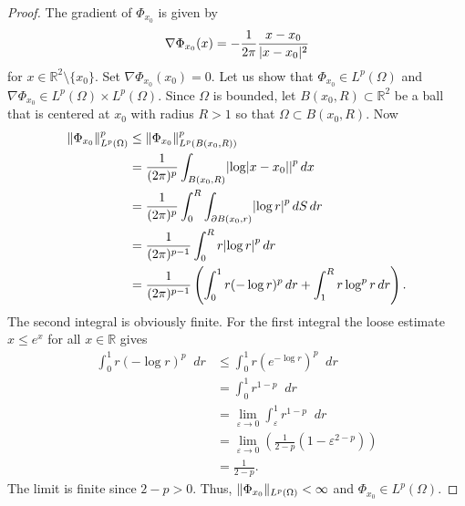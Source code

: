 \documentclass[english, 12pt, a4paper, sci, utf8, a-2b, online]{aaltothesis}
\theoremstyle{definition}
\theoremstyle{plain}
\DeclarePairedDelimiter\abs{\lvert}{\rvert}
\DeclarePairedDelimiter\norm{\lVert}{\rVert}
\newcommand*\diff{\mathop{}\!d}
\numberwithin{equation}{section}
\begin{document}
\begin{proof}
    The gradient of $\Phi_{x_0}$ is given by
    \begin{equation*}
        \nabla \Phi_{x_0}(x) = -\frac{1}{2\pi} \frac{x-x_0}{\abs{x-x_0}^2}
    \end{equation*}
    for $x \in \mathbb{R}^2 \setminus \{ x_0 \}$.
    Set $\nabla \Phi_{x_0}(x_0) = 0$.
    Let us show that $\Phi_{x_0} \in L^p(\Omega)$ and
    $\nabla \Phi_{x_0} \in L^p(\Omega) \times L^p(\Omega)$.
    Since $\Omega$ is bounded, let $B(x_0,R) \subset \mathbb{R}^2$
    be a ball that is centered at $x_0$ with radius $R > 1$
    so that $\Omega \subset B(x_0,R)$. Now
    \begin{align*}
        \norm{\Phi_{x_0}}_{L^p(\Omega)}^p
        &\leq \norm{\Phi_{x_0}}_{L^p(B(x_0,R))}^p \\
        &= \frac{1}{(2\pi)^p} \int_{B(x_0,R)} \abs*{\log\abs{x-x_0}}^p \diff x \\
        &= \frac{1}{(2\pi)^p} \int_{0}^{R} \int_{\partial B(x_0,r)}
            \abs*{\log r}^p \diff S \diff r \\
        &= \frac{1}{(2\pi)^{p-1}} \int_{0}^{R} r \abs*{\log r}^p \diff r \\
        &= \frac{1}{(2\pi)^{p-1}} \left(
            \int_{0}^{1} r (-\log r)^p \diff r
                + \int_{1}^{R} r \log^p r \diff r
                \right).
    \end{align*}
    The second integral is obviously finite.
    For the first integral the loose estimate $x \leq e^x$
    for all $x \in \mathbb{R}$ gives
    \begin{align*}
        \int_{0}^{1} r (-\log r)^p \diff r
        &\leq \int_{0}^{1} r \left(e^{-\log r} \right)^p \diff r \\
        &= \int_{0}^{1} r^{1-p} \diff r \\
        &= \lim_{\varepsilon \to 0} \int_{\varepsilon}^{1} r^{1-p} \diff r \\
        &= \lim_{\varepsilon \to 0} \left(
            \frac{1}{2-p} \left( 1 - \varepsilon^{2-p} \right)
                \right) \\
        &= \frac{1}{2-p}.
    \end{align*}
    The limit is finite since $2-p > 0$. Thus,
    $\norm{\Phi_{x_0}}_{L^p(\Omega)} < \infty$ and $\Phi_{x_0} \in L^p(\Omega)$.


\end{proof}
\end{document}
